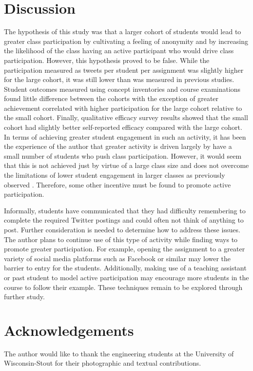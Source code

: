 \documentclass[12pt]{article}
\begin{document}
\section*{Discussion}
The hypothesis of this study was that a larger cohort of students would lead to greater class participation by cultivating a feeling of anonymity and by increasing the likelihood of the class having an active participant who would drive class participation. However, this hypothesis proved to be false. While the participation measured as tweets per student per assignment was slightly higher for the large cohort, it was still lower than was measured in previous studies. Student outcomes measured using concept inventories and course examinations found little difference between the cohorts with the exception of greater achievement correlated with higher participation for the large cohort relative to the small cohort. Finally, qualitative efficacy survey results showed that the small cohort had slightly better self-reported efficacy compared with the large cohort. In terms of achieving greater student engagement in such an activity, it has been the experience of the author that greater activity is driven largely by have a small number of students who push class participation. However, it would seem that this is not achieved just by virtue of a large class size and does not overcome the limitations of lower student engagement in larger classes as previously observed \cite{ahlfeldt_measurement_2005}. Therefore, some other incentive must be found to promote active participation.

Informally, students have communicated that they had difficulty remembering to complete the required Twitter postings and could often not think of anything to post. Further consideration is needed to determine how to address these issues. The author plans to continue use of this type of activity while finding ways to promote greater participation. For example, opening the assignment to a greater variety of social media platforms such as Facebook or similar may lower the barrier to entry for the students. Additionally, making use of a teaching assistant or past student to model active participation may encourage more students in the course to follow their example. These techniques remain to be explored through further study.


\section*{Acknowledgements}
The author would like to thank the engineering students at the University of Wisconsin-Stout for their photographic and textual contributions.
\end{document}

